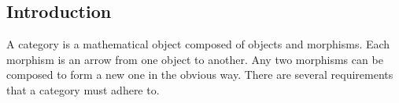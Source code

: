 \documentclass[12pt]{article}
\begin{document}
\subsection{Introduction}

A category is a mathematical object composed of objects and morphisms. Each morphism is an arrow from one object to another. Any two morphisms can be composed to form a new one in the obvious way. There are several requirements that a category must adhere to.

\end{document}
